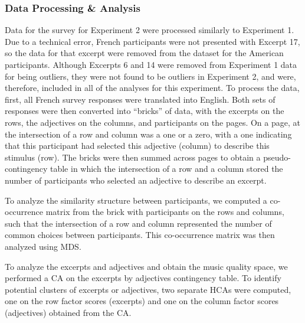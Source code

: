 \documentclass[
  english,
  man]{apa6}
\begin{document}
\hypertarget{data-processing-analysis}{%
\subsubsection{Data Processing \& Analysis}\label{data-processing-analysis}}

Data for the survey for Experiment 2 were processed similarly to Experiment 1. Due to a technical error, French participants were not presented with Excerpt 17, so the data for that excerpt were removed from the dataset for the American participants. Although Excerpts 6 and 14 were removed from Experiment 1 data for being outliers, they were not found to be outliers in Experiment 2, and were, therefore, included in all of the analyses for this experiment. To process the data, first, all French survey responses were translated into English. Both sets of responses were then converted into ``bricks'' of data, with the excerpts on the rows, the adjectives on the columns, and participants on the pages. On a page, at the intersection of a row and column was a one or a zero, with a one indicating that this participant had selected this adjective (column) to describe this stimulus (row). The bricks were then summed across pages to obtain a pseudo-contingency table in which the intersection of a row and a column stored the number of participants who selected an adjective to describe an excerpt.

To analyze the similarity structure between participants, we computed a co-occurrence matrix from the brick with participants on the rows and columns, such that the intersection of a row and column represented the number of common choices between participants. This co-occurrence matrix was then analyzed using MDS.

To analyze the excerpts and adjectives and obtain the music quality space, we performed a CA on the excerpts by adjectives contingency table. To identify potential clusters of excerpts or adjectives, two separate HCAs were computed, one on the row factor scores (excerpts) and one on the column factor scores (adjectives) obtained from the CA.
\end{document}
